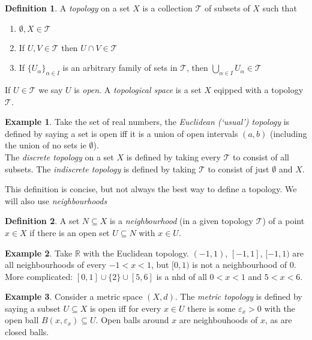 \documentclass{tufte-handout}
\def\cT {\mathcal{T}}
\def\RR{\mathbb{R}}
\theoremstyle{definition}
\newtheorem{definition}{Definition}
\newtheorem{example}{Example}
\begin{document}
\begin{definition} 
	A \emph{topology} on a set $X$ is a collection $\cT$ of subsets of $X$ 
	such that 
	\begin{enumerate} 
	
		\item $\emptyset,X\in\cT$ 
		
		\item If $U,V\in \cT$ then $U\cap V\in \cT$ 

		\item If $\{U_\alpha\}_{\alpha\in I}$ is an arbitrary family of sets in $\cT$, then $\bigcup_{\alpha\in I} U_\alpha \in \cT$

	\end{enumerate}
 
	If $U\in \cT$ we say $U$ is \emph{open}. A \emph{topological space} is a set $X$ 
	eqipped with a topology $\cT$.
\end{definition}

\begin{example} 
	Take the set of real numbers, the \emph{Euclidean (`usual') topology} is 
	defined by saying a set is open iff it is a union of open intervals $(a,b)$ (including the 
	union of no sets ie $\emptyset$).\\ 
	The \emph{discrete topology} on a set $X$ is defined by 
	taking every $\cT$ to consist of all subsets. The \emph{indiscrete topology} is defined by 
	taking $\cT$ to consist of just $\emptyset$ and $X$. 
\end{example}

This definition is concise, but not always the best way to define a topology. We will also 
use \emph{neighbourhoods}

\begin{definition} 
	A set $N\subseteq X$ is a \emph{neighbourhood} (in a given topology $\cT$) of a point $x\in X$ if there is an open 
	set $U\subseteq N$ with $x\in U$.
\end{definition}


\begin{example} 
	Take $\RR$ with the Euclidean topology. $(-1,1)$, $[-1,1]$, $[-1,1)$ are all 
	neighbourhoods of every $-1<x<1$, but $[0,1)$ is not a neighbourhood of $0$. More 
	complicated: $[0,1] \cup \{2\}\cup [5,6]$ is a nhd of all $0<x<1$ and $5<x<6$.
\end{example}

\begin{example} 	
	Consider a metric space $(X,d)$. The \emph{metric topology} is defined by saying a 
	subset $U\subseteq X$ is open iff for every $x\in U$ there is some $\varepsilon_x > 
	0$ with the open ball $B(x,\varepsilon_x) \subseteq U$. Open balls around $x$ are 
	neighbouhoods of $x$, as are closed balls.
\end{example}
\end{document}
